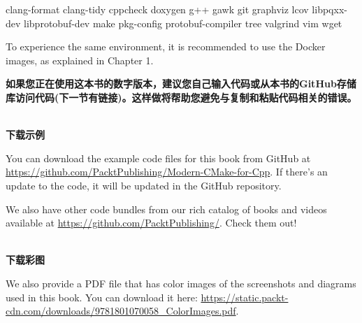 clang-format clang-tidy cppcheck doxygen g++ gawk git graphviz lcov libpqxx-dev libprotobuf-dev make pkg-config protobuf-compiler tree valgrind vim wget

To experience the same environment, it is recommended to use the Docker images, as explained in Chapter 1.

\textbf{如果您正在使用这本书的数字版本，建议您自己输入代码或从本书的GitHub存储库访问代码(下一节有链接)。这样做将帮助您避免与复制和粘贴代码相关的错误。}

\hspace*{\fill} \\ %
\textbf{下载示例}

You can download the example code files for this book from GitHub at \url{https://github.com/PacktPublishing/Modern-CMake-for-Cpp}. If there's an update to the code, it will be updated in the GitHub repository.

We also have other code bundles from our rich catalog of books and videos available at \url{https://github.com/PacktPublishing/}. Check them out!


\hspace*{\fill} \\ %
\textbf{下载彩图}

We also provide a PDF file that has color images of the screenshots and diagrams used in this book. You can download it here: \url{https://static.packt-cdn.com/downloads/9781801070058_ColorImages.pdf}.











